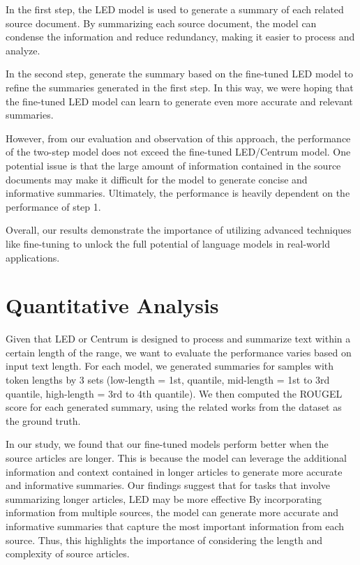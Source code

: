 \documentclass[12pt, twocolumn]{article}
\numberwithin{equation}{section}
\begin{document}
In the first step, the LED model is used to generate a summary of each related source document. By summarizing each source document, the model can condense the information and reduce redundancy, making it easier to process and analyze.

In the second step, generate the summary based on the fine-tuned LED model to refine the summaries generated in the first step. In this way, we were hoping that the fine-tuned LED model can learn to generate even more accurate and relevant summaries.

However, from our evaluation and observation of this approach, the performance of the two-step model does not exceed the fine-tuned LED/Centrum model. One potential issue is that the large amount of information contained in the source documents may make it difficult for the model to generate concise and informative summaries. Ultimately, the performance is heavily dependent on the performance of step 1.

Overall, our results demonstrate the importance of utilizing advanced techniques like fine-tuning to unlock the full potential of language models in real-world applications.

\section{Quantitative Analysis}
\label{sec:quantitative}

Given that LED or Centrum is designed to process and summarize text within a certain length of the range, we want to evaluate the performance varies based on input text length. For each model, we generated summaries for samples with token lengths by 3 sets (low-length = 1st, quantile, mid-length = 1st to 3rd quantile, high-length = 3rd to 4th quantile). We then computed the ROUGEL score for each generated summary, using the related works from the dataset as the ground truth.

In our study, we found that our fine-tuned models perform better when the source articles are longer. This is because the model can leverage the additional information and context contained in longer articles to generate more accurate and informative summaries. Our findings suggest that for tasks that involve summarizing longer articles, LED may be more effective By incorporating information from multiple sources, the model can generate more accurate and informative summaries that capture the most important information from each source. Thus, this highlights the importance of considering the length and complexity of source articles.
\end{document}
